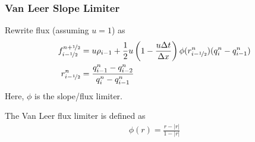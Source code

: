 
\begin{frame}
	\frametitle{Van Leer Slope Limiter}
	Rewrite flux (assuming $u = 1$) as
	\begin{align*}
		f_{i-\nicefrac{1}{2}}^{n+\nicefrac{1}{2}} &= u \rho_{i-1} + \frac{1}{2} u \left( 1 - \frac{u\Delta t}{\Delta x} \right) \phi(r_{i-\nicefrac{1}{2}}^n) (q_i^n - q_{i-1}^n)\\
		r_{i-\nicefrac{1}{2}}^n &= \frac{q_{i-1}^n - q_{i-2}^n}{q_i^n - q_{i-1}^n}
	\end{align*}
	Here, $\phi$ is the slope/flux limiter.
	
	The Van Leer flux limiter is defined as
	\begin{align*}
		\phi(r) = \frac{r - |r|}{1 - |r|}
	\end{align*}
\end{frame}









